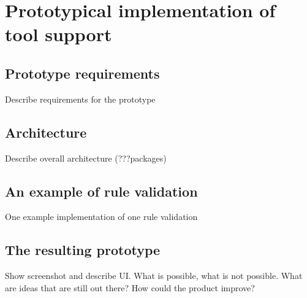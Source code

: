 \chapter{Prototypical implementation of tool support}
\section{Prototype requirements}
Describe requirements for the prototype
\section{Architecture}
Describe overall architecture (???packages)
\section{An example of rule validation}
One example implementation of one rule validation
\section{The resulting prototype}
Show screenshot and describe UI. What is possible, what is not possible. 
What are ideas that are still out there? 
How could the product improve?



